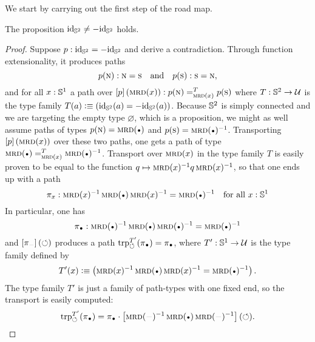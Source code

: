 \documentclass[english,a4paper]{lmcs}
\begin{document}
We start by carrying out the first step of the road map.

\begin{lem}
  \label{lemma:S2-id-neq-minusid}%
  The proposition $\mathord{\mathrm{id}}_{{\mathbb S^{2}}} \neq -\mathord{\mathrm{id}}_{{\mathbb S^{2}}}$ holds.
\end{lem}
\begin{proof}
  Suppose $p:\mathord{\mathrm{id}}_{{\mathbb S^{2}}} = -\mathord{\mathrm{id}}_{{\mathbb S^{2}}}$ and derive a contradiction. Through
  function extensionality, it produces paths
  \begin{displaymath}
    p(\textsc{n}) : \textsc{n} = \textsc{s}
    \quad\text{and}\quad
    p(\textsc{s}) : \textsc{s} = \textsc{n},
  \end{displaymath}
  and for all $x:{{\mathbb S^{1}}}$ a path over
  $\left[{p}\right] (\operatorname{\textsc{mrd}}(x)): p(\textsc{n}) =^{T}_{\operatorname{\textsc{mrd}}(x)} p(\textsc{s})$ where
  $T: {{\mathbb S^{2}}} \to \mathcal{U}$ is the type family
  $T(a)\vcentcolon\equiv (\mathord{\mathrm{id}}_{{\mathbb S^{2}}}(a) = -\mathord{\mathrm{id}}_{{\mathbb S^{2}}}(a))$. Because ${{\mathbb S^{2}}}$ is simply
  connected and we are targeting the empty type $\varnothing$, which
  is a proposition, we might as well assume paths of types $p(\north)=\mrd(\base)$
  and $p(\south) = \inv{\mrd(\base)}$. Transporting $\left[{p}\right](\operatorname{\textsc{mrd}}(x))$ over
  these two paths, one gets a path of type
  $\pathover {\mrd(\base)} T {\mrd(x)} {\inv{\mrd(\base)}}$.
  Transport over $\operatorname{\textsc{mrd}}(x)$ in the type family $T$ is
  easily proven to be equal to the function
  $q \mapsto \operatorname{\textsc{mrd}}(x)^{-1} q \operatorname{\textsc{mrd}}(x)^{-1}$, so that one
  ends up with a path
  \begin{displaymath}
    \pi_x\from \inv{\mrd(x)} \mrd(\base) \inv{\mrd(x)} = \inv{\mrd(\base)}
    \quad
    \text{for all }x\from\Sc
  \end{displaymath}
  In particular, one has
  \begin{displaymath}
    \pi_{\base} \from \inv{\mrd(\base)} \mrd(\base) \inv{\mrd(\base)}
    = \inv{\mrd(\base)}
  \end{displaymath}
  and $\ap {\pi_{\blank}} (\Sloop)$ produces a path
  $\trp [T'] \Sloop (\pi_{\base}) = \pi_{\base}$, where $T':{{\mathbb S^{1}}}\to\mathcal{U}$
  is the type family defined by
  \begin{displaymath}
    T'(x) \defequi \left(\inv{\mrd(x)}\mrd(\base)\inv{\mrd(x)}
      = \inv{\mrd(\base)} \right).
  \end{displaymath}
  The type family $T'$ is just a family of path-types with one fixed
  end, so the transport is easily computed:
  \begin{displaymath}
    \trp [T'] \Sloop (\pi_{\base}) = \pi_{\base} \cdot
    \ap{\inv{\mrd(\blank)} \mrd(\base) \inv{\mrd(\blank)}}(\Sloop).
  \end{displaymath}

\end{proof}
\end{document}
